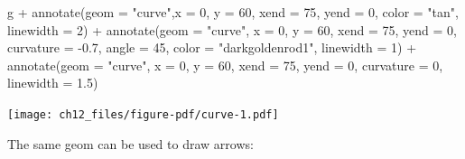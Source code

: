 \documentclass[
  letterpaper,
  DIV=11,
  numbers=noendperiod]{scrreprt}
\newenvironment{Shaded}{\begin{snugshade}}{\end{snugshade}}
\newcommand{\AttributeTok}[1]{\textcolor[rgb]{0.40,0.45,0.13}{#1}}
\newcommand{\DecValTok}[1]{\textcolor[rgb]{0.68,0.00,0.00}{#1}}
\newcommand{\FloatTok}[1]{\textcolor[rgb]{0.68,0.00,0.00}{#1}}
\newcommand{\FunctionTok}[1]{\textcolor[rgb]{0.28,0.35,0.67}{#1}}
\newcommand{\NormalTok}[1]{\textcolor[rgb]{0.00,0.23,0.31}{#1}}
\newcommand{\SpecialCharTok}[1]{\textcolor[rgb]{0.37,0.37,0.37}{#1}}
\newcommand{\StringTok}[1]{\textcolor[rgb]{0.13,0.47,0.30}{#1}}
\begin{document}
\begin{Shaded}
\begin{Highlighting}[]
\NormalTok{g }\SpecialCharTok{+}
  \FunctionTok{annotate}\NormalTok{(}\AttributeTok{geom =} \StringTok{"curve"}\NormalTok{,}\AttributeTok{x =} \DecValTok{0}\NormalTok{, }\AttributeTok{y =} \DecValTok{60}\NormalTok{, }\AttributeTok{xend =} \DecValTok{75}\NormalTok{, }\AttributeTok{yend =} \DecValTok{0}\NormalTok{,}
             \AttributeTok{color =} \StringTok{"tan"}\NormalTok{, }\AttributeTok{linewidth =} \DecValTok{2}\NormalTok{) }\SpecialCharTok{+}
  \FunctionTok{annotate}\NormalTok{(}\AttributeTok{geom =} \StringTok{"curve"}\NormalTok{, }
           \AttributeTok{x =} \DecValTok{0}\NormalTok{, }\AttributeTok{y =} \DecValTok{60}\NormalTok{, }\AttributeTok{xend =} \DecValTok{75}\NormalTok{, }\AttributeTok{yend =} \DecValTok{0}\NormalTok{,}
             \AttributeTok{curvature =} \SpecialCharTok{{-}}\FloatTok{0.7}\NormalTok{, }\AttributeTok{angle =} \DecValTok{45}\NormalTok{,}
             \AttributeTok{color =} \StringTok{"darkgoldenrod1"}\NormalTok{, }\AttributeTok{linewidth =} \DecValTok{1}\NormalTok{) }\SpecialCharTok{+}
  \FunctionTok{annotate}\NormalTok{(}\AttributeTok{geom =} \StringTok{"curve"}\NormalTok{, }\AttributeTok{x =} \DecValTok{0}\NormalTok{, }\AttributeTok{y =} \DecValTok{60}\NormalTok{, }\AttributeTok{xend =} \DecValTok{75}\NormalTok{, }\AttributeTok{yend =} \DecValTok{0}\NormalTok{,}
             \AttributeTok{curvature =} \DecValTok{0}\NormalTok{, }\AttributeTok{linewidth =} \FloatTok{1.5}\NormalTok{)}
\end{Highlighting}
\end{Shaded}

\texttt{[image: ch12\_files/figure-pdf/curve-1.pdf]}

The same geom can be used to draw arrows:
\end{document}
